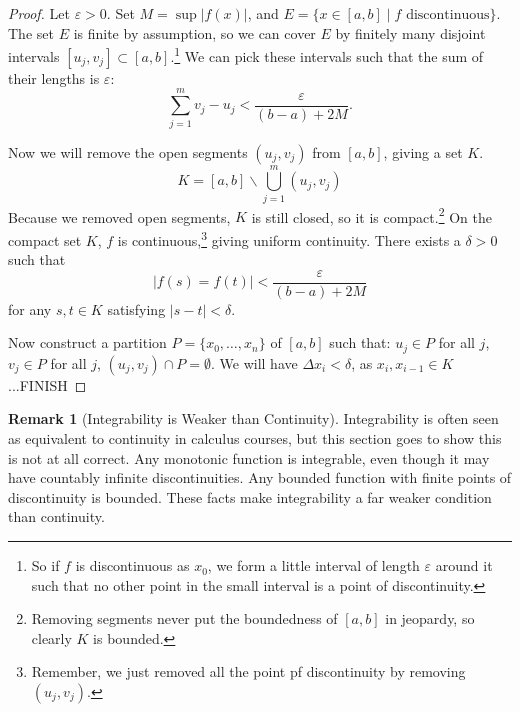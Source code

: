 \documentclass{article}
\theoremstyle{definition}
\newtheorem{remark}{Remark}[section]
\begin{document}
	\begin{proof}
		Let $ \varepsilon>0 $. Set $ M=\sup |f(x)| $, and $ E=\{x\in[a,b]\mid f\text{ discontinuous}\} $. The set $ E $ is finite by assumption, so we can cover $ E $ by finitely many disjoint intervals $ [u_j,v_j]\subset[a,b] $.\footnote{So if $ f $ is discontinuous as $ x_0 $, we form a little interval of length $ \varepsilon $ around it such that no other point in the small interval is a point of discontinuity.} We can pick these intervals such that the sum of their lengths is $ \varepsilon $:
		$$\sum_{j=1}^{m} v_j-u_j<\frac{\varepsilon}{(b-a)+2M}. $$ 
		
		Now we will remove the open segments $ (u_j,v_j) $ from $ [a,b] $, giving a set $ K $. $$K=[a,b]\backslash\bigcup_{j=1}^m(u_j,v_j) $$ Because we removed open segments, $ K $ is still closed, so it is compact.\footnote{Removing segments never put the boundedness of $ [a,b] $ in jeopardy, so clearly $ K $ is bounded.} On the compact set $ K $, $ f $ is continuous,\footnote{Remember, we just removed all the point pf discontinuity by removing $ (u_j,v_j) $.} giving uniform continuity. There exists a $ \delta>0 $ such that $$|f(s)=f(t)|<\frac{\varepsilon}{(b-a)+2M} $$ for any $ s,t\in K $ satisfying $ |s-t|<\delta $.
		
		Now construct a partition $ P=\{x_0,\ldots,x_n\} $ of $ [a,b] $ such that: $ u_j\in P $ for all $ j $, $ v_j\in P $ for all $ j $, $ (u_j,v_j)\cap P=\emptyset $. We will have $ \Delta x_i<\delta $, as $ x_i,x_{i-1}\in K $...{\color{red}FINISH}
		
		
	\end{proof}
	\begin{remark}[Integrability is Weaker than Continuity]
		Integrability is often seen as equivalent to continuity in calculus courses, but this section goes to show this is not at all correct. Any monotonic function is integrable, even though it may have countably infinite discontinuities. Any bounded function with finite points of discontinuity is bounded. These facts make integrability a far weaker condition than continuity. 
	\end{remark}
\end{document}

